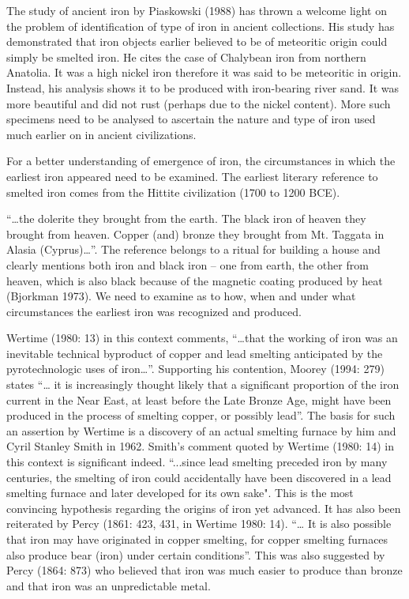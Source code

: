 The study of ancient iron by Piaskowski (1988) has thrown a welcome light on the problem of identification of type of iron in ancient collections. His study has demonstrated that iron objects earlier believed to be of meteoritic origin could simply be smelted iron. He cites the case of Chalybean iron from northern Anatolia. It was a high nickel iron therefore it was said to be meteoritic in origin. Instead, his analysis shows it to be produced with iron-bearing river sand. It was more beautiful and did not rust (perhaps due to the nickel content). More such specimens need to be analysed to ascertain the nature and type of iron used much earlier on in ancient civilizations.

For a better understanding of emergence of iron, the circumstances in which the earliest iron appeared need to be examined. The earliest literary reference to smelted iron comes from the Hittite civilization (1700 to 1200 BCE). 

{\footnotesize “…the dolerite they brought from the earth. The black iron of heaven they brought from heaven. Copper (and) bronze they brought from Mt. Taggata in Alasia (Cyprus)…”.} The reference belongs to a ritual for building a house and clearly mentions both iron and black iron – one from earth, the other from heaven, which is also black because of the magnetic coating produced by heat (Bjorkman 1973). We need to examine as to how, when and under what circumstances the earliest iron was recognized and produced. 

Wertime (1980: 13) in this context comments, {\footnotesize“…that the working of iron was an inevitable technical byproduct of copper and lead smelting anticipated by the pyrotechnologic uses of iron…”}. Supporting his contention, Moorey (1994: 279) states “… it is increasingly thought likely that a significant proportion of the iron current in the Near East, at least before the Late Bronze Age, might have been produced in the process of smelting copper, or possibly lead”. The basis for such an assertion by Wertime is a discovery of an actual smelting furnace by him and Cyril Stanley Smith in 1962. Smith’s comment quoted by Wertime (1980: 14) in this context is significant indeed. {\footnotesize“...since lead smelting preceded iron by many centuries, the smelting of iron could accidentally have been discovered in a lead smelting furnace and later developed for its own sake"}. This is the most convincing hypothesis regarding the origins of iron yet advanced. It has also been reiterated by Percy (1861: 423, 431, in Wertime 1980: 14).  {\footnotesize “… It is also possible that iron may have originated in copper smelting, for copper smelting furnaces also produce bear (iron) under certain conditions”}. This was also suggested by Percy (1864: 873) who believed that iron was much easier to produce than bronze and that iron was an unpredictable metal.

